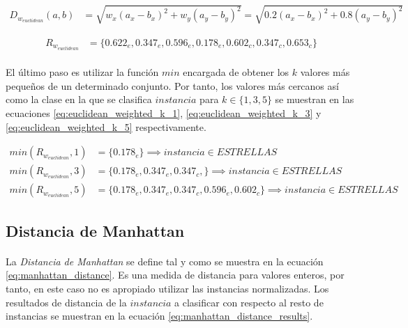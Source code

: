 \documentclass{article}
\begin{document}
			\begin{align}
			\label{eq:euclidean_weighted_distance}
				D_{w_{euclidean}}(a,b) &= \sqrt{w_x(a_x - b_x)^2 + w_y(a_y - b_y)^2} = \sqrt{0.2(a_x - b_x)^2 + 0.8(a_y - b_y)^2}
			\end{align}

			\begin{align}
			\label{eq:euclidean_weighted_distance_results}
				R_{w_{euclidean}} &= \{0.622_e, 0.347_e, 0.596_e, 0.178_e, 0.602_c, 0.347_c, 0.653_c\}
			\end{align}

			\paragraph{}
			El último paso es utilizar la función $min$ encargada de obtener los $k$ valores más pequeños de un determinado conjunto. Por tanto, los valores más cercanos así como la clase en la que se clasifica $instancia$ para $k \in \{1,3,5\}$ se muestran en las ecuaciones \eqref{eq:euclidean_weighted_k_1}, \eqref{eq:euclidean_weighted_k_3} y \eqref{eq:euclidean_weighted_k_5} respectivamente.

			\begin{align}
			\label{eq:euclidean_weighted_k_1}
				min(R_{w_{euclidean}},1) &= \{ 0.178_e \}  \implies instancia \in ESTRELLAS \\
			\label{eq:euclidean_weighted_k_3}
				min(R_{w_{euclidean}},3) &= \{ 0.178_e, 0.347_e, 0.347_c,\}  \implies instancia \in ESTRELLAS \\
			\label{eq:euclidean_weighted_k_5}
				min(R_{w_{euclidean}},5) &= \{ 0.178_e, 0.347_e, 0.347_c, 0.596_e, 0.602_c\} \implies instancia \in ESTRELLAS
			\end{align}


		\subsection{Distancia de Manhattan}
		\label{sec:manhattan}

			\paragraph{}
			La \emph{Distancia de Manhattan} se define tal y como se muestra en la ecuación \eqref{eq:manhattan_distance}. Es una medida de distancia para valores enteros, por tanto, en este caso no es apropiado utilizar las instancias normalizadas. Los resultados de distancia de la $instancia$ a clasificar con respecto al resto de instancias se muestran en la ecuación \eqref{eq:manhattan_distance_results}.
\end{document}
